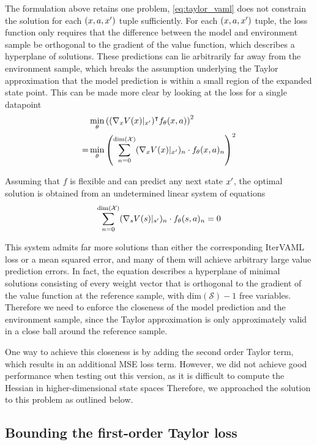 The formulation above retains one problem, \autoref{eq:taylor_vaml} does not constrain the solution for each $(x,a,x')$ tuple sufficiently.
For each $(x,a,x')$ tuple, the loss function only requires that the difference between the model and environment sample be orthogonal to the gradient of the value function, which describes a hyperplane of solutions.
These predictions can lie arbitrarily far away from the environment sample, which breaks the assumption underlying the Taylor approximation that the model prediction is within a small region of the expanded state point.
This can be made more clear by looking at the loss for a single datapoint
\begin{align}
    &\min_\theta \left((\nabla_x V(x)|_{x'})^\intercal f_\theta(x,a) \right) ^2\\
    =&\min_\theta \left(\sum_{n=0}^{\text{dim}(\mathcal{X})} (\nabla_x V(x)|_{x'})_n \cdot f_\theta(x,a)_n\right)^2
\end{align}

Assuming that $f$ is flexible and can predict any next state $x'$, the optimal solution is obtained from an undetermined linear system of equations
\begin{align}
    \sum_{n=0}^{\text{dim}(\mathcal{X})} (\nabla_s V(s)|_{s'})_n \cdot f_\theta(s,a)_n = 0
\end{align}

This system admits far more solutions than either the corresponding IterVAML loss or a mean squared error, and many of them will achieve arbitrary large value prediction errors.
In fact, the equation describes a hyperplane of minimal solutions consisting of every weight vector that is orthogonal to the gradient of the value function at the reference sample, with $\text{dim}(\mathcal{S}) - 1$ free variables.
Therefore we need to enforce the closeness of the model prediction and the environment sample, since the Taylor approximation is only approximately valid in a close ball around the reference sample.

One way to achieve this closeness is by adding the second order Taylor term, which results in an additional MSE loss term.
However, we did not achieve good performance when testing out this version, as it is difficult to compute the Hessian in higher-dimensional state spaces 
Therefore, we approached the solution to this problem as outlined below.

\subsection{Bounding the first-order Taylor loss}

